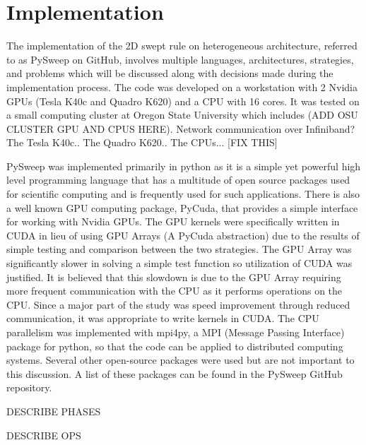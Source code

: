 \documentclass[review]{elsarticle}
\begin{document}
%
%

\section{Implementation}
The implementation of the 2D swept rule on heterogeneous architecture, referred to as PySweep on GitHub, involves multiple languages, architectures, strategies, and problems which will be discussed along with decisions made during the implementation process. The code was developed on a workstation with 2 Nvidia GPUs (Tesla K40c and Quadro K620) and a CPU with 16 cores. It was tested on a small computing cluster at Oregon State University which includes (ADD OSU CLUSTER GPU AND CPUS HERE). Network communication over Infiniband? The Tesla K40c.. The Quadro K620.. The CPUs... [FIX THIS]

\par
PySweep was implemented primarily in python as it is a simple yet powerful high level programming language that has a multitude of open source packages used for scientific computing and is frequently used for such applications. There is also a well known GPU computing package, PyCuda, that provides a simple interface for working with Nvidia GPUs. The GPU kernels were specifically written in CUDA in lieu of using GPU Arrays (A PyCuda abstraction) due to the results of simple testing and comparison between the two strategies. The GPU Array was significantly slower in solving a simple test function so utilization of CUDA was justified. It is believed that this slowdown is due to the GPU Array requiring more frequent communication with the CPU as it performs operations on the CPU. Since a major part of the study was speed improvement through reduced communication, it was appropriate to write kernels in CUDA. The CPU parallelism was implemented with mpi4py, a MPI (Message Passing Interface) package for python, so that the code can be applied to distributed computing systems. Several other open-source packages were used but are not important to this discussion. A list of these packages can be found in the PySweep GitHub repository.


\par
DESCRIBE PHASES

\par
DESCRIBE OPS
\end{document}
